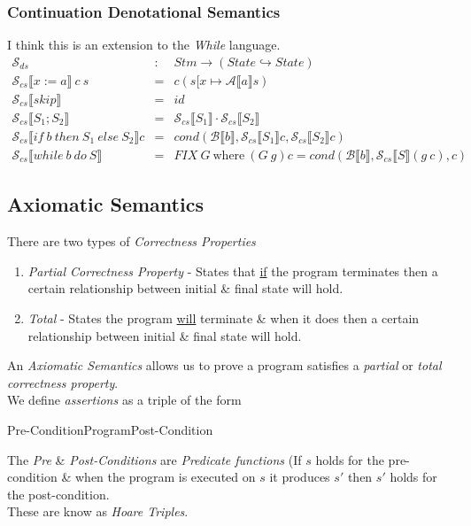 \documentclass[11pt,a4paper]{article}
\begin{document}
\subsubsection{Continuation Denotational Semantics}
I think this is an extension to the \textit{While} language.\\
\[\begin{array}{lcl}
\mathcal{S}_{ds}&:&Stm\to(State\hookrightarrow State)\\
\mathcal{S}_{cs}\llbracket x:=a\rrbracket\ c\ s&=&c(s[x\mapsto\mathcal{A}\llbracket a\rrbracket s)\\
\mathcal{S}_{cs}\llbracket skip\rrbracket&=&id\\
\mathcal{S}_{cs}\llbracket S_1;S_2\rrbracket&=&\mathcal{S}_{cs}\llbracket S_1\rrbracket\cdot\mathcal{S}_{cs}\llbracket S_2\rrbracket\\
\mathcal{S}_{cs}\llbracket if\ b\ then\ S_1\ else\ S_2\rrbracket c&=&cond(\mathcal{B}\llbracket b \rrbracket,\mathcal{S}_{cs}\llbracket S_1\rrbracket c,\mathcal{S}_{cs}\llbracket S_2\rrbracket c)\\
\mathcal{S}_{cs}\llbracket while\ b\ do\ S\rrbracket&=&FIX\ G\ \mathrm{where}\ (G\ g)c=cond(\mathcal{B}\llbracket b\rrbracket,\mathcal{S}_{cs}\llbracket S\rrbracket(g\ c),c)
\end{array}\]

\subsection{Axiomatic Semantics}

There are two types of \textit{Correctness Properties}
\begin{enumerate}
	\item\textit{Partial Correctness Property} - States that \underline{if} the program terminates then a certain relationship between initial \& final state will hold.
	\item\textit{Total} - States the program \underline{will} terminate \& when it does then a certain relationship between initial \& final state will hold.
\end{enumerate}

An \textit{Axiomatic Semantics} allows us to prove a program satisfies a \textit{partial} or \textit{total correctness property}.\\

We define \textit{assertions} as a triple of the form
\begin{center}
Pre-Condition\quad Program\quad Post-Condition
\end{center}
The \textit{Pre} \& \textit{Post-Conditions} are \textit{Predicate functions} (\ie If $s$ holds for the pre-condition \& when the program is executed on $s$ it produces $s'$ then $s'$ holds for the post-condition.\\
\NB These are know as \textit{Hoare Triples}.\\
\end{document}
